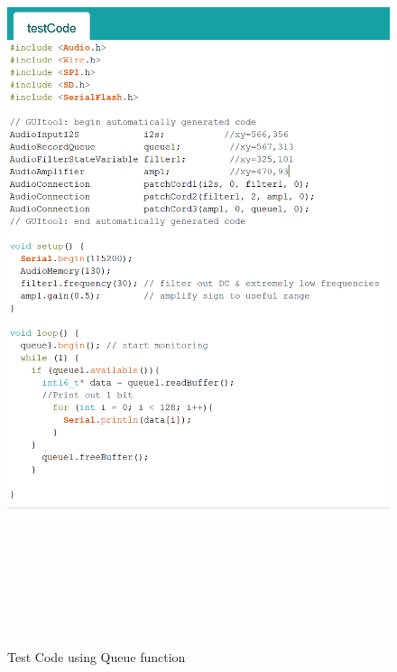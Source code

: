 \begin{figure}[H]
\centering
\noindent 
\includegraphics[width=15.47cm,height=22.6cm]{./images/testCode}
\caption{Test Code using Queue function}
\label{fig:testCode}
\end{figure}